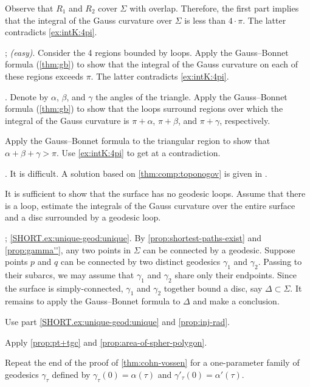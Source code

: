 \begin{multicols}{2}
Observe that $R_1$ and $R_2$ cover $\Sigma$ with overlap.
Therefore, the first part implies that the integral of the Gauss curvature over $\Sigma$ is less than $4\cdot\pi$.
The latter contradicts \ref{ex:intK:4pi}.

\parbf{\ref{ex:self-intersections}}; \textit{(easy)}.
Consider the 4 regions bounded by loops.
Apply the Gauss--Bonnet formula (\ref{thm:gb}) to show that the integral of the Gauss curvature on each of these regions exceeds $\pi$.
The latter contradicts \ref{ex:intK:4pi}.

.
Denote by $\alpha$, $\beta$, and $\gamma$ the angles of the triangle.
Apply the Gauss--Bonnet formula (\ref{thm:gb}) to show that the loops surround regions over which the integral of the Gauss curvature is $\pi+\alpha$, $\pi+\beta$, and $\pi+\gamma$, respectively.

Apply the Gauss--Bonnet formula to the triangular region to show that $\alpha+\beta+\gamma>\pi$.
Use \ref{ex:intK:4pi} to get at a contradiction.


.
It is difficult.
A solution based on \ref{thm:comp:toponogov} is given in \cite{petrunin2021}.

It is sufficient to show that the surface has no geodesic loops.
Assume that there is a loop, estimate the integrals of the Gauss curvature over the entire surface and a disc surrounded by a geodesic loop.

\parbf{\ref{ex:unique-geod}}; \ref{SHORT.ex:unique-geod:unique}.
By \ref{prop:shortest-paths-exist} and \ref{prop:gamma''}, any two points in $\Sigma$ can be connected by a geodesic.
Suppose points $p$ and $q$ can be connected by two distinct geodesics $\gamma_1$ and $\gamma_2$.
Passing to their subarcs, we may assume that $\gamma_1$ and $\gamma_2$ share only their endpoints.
Since the surface is simply-connected, $\gamma_1$ and $\gamma_2$ together bound a disc, say $\Delta\subset\Sigma$.
It remains to apply the Gauss--Bonnet formula to $\Delta$ and make a conclusion.
 
Use part \ref{SHORT.ex:unique-geod:unique} and \ref{prop:inj-rad}.

Apply \ref{prop:pt+tgc} and \ref{prop:area-of-spher-polygon}.

Repeat the end of the proof of \ref{thm:cohn-vossen} for a one-parameter family of geodesics $\gamma_\tau$ defined by $\gamma_\tau(0)=\alpha(\tau)$ and $\gamma'_\tau(0)=\alpha'(\tau)$. 


\end{multicols}
